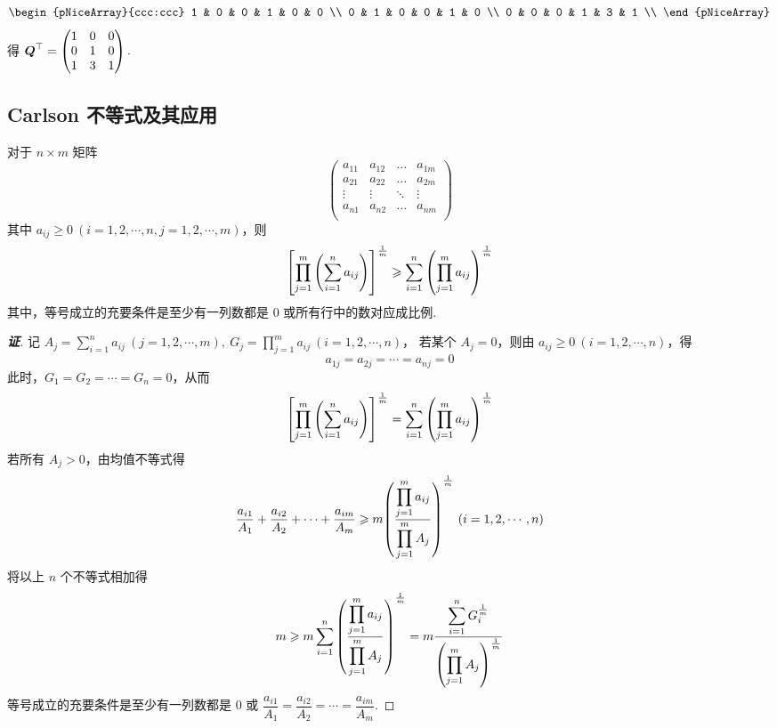 \begin{solution}
$$        \begin{pNiceArray}{ccc:ccc}
            1 & 0 & 0 & 1 & 0 & 0 \\
            0 & 1 & 0 & 0 & 1 & 0 \\
            0 & 0 & 0 & 1 & 3 & 1 \\
        \end{pNiceArray}$$
    得 $\vb*{Q}^{\top}=\begin{pmatrix}
            1 & 0 & 0 \\
            0 & 1 & 0 \\
            1 & 3 & 1
        \end{pmatrix}.$
\end{solution}

\subsection{Carlson 不等式及其应用}

\begin{theorem}
    对于 $n\times m$ 矩阵
    $$\begin{pmatrix}
            a_{11} & a_{12} & \dots  & a_{1m} \\
            a_{21} & a_{22} & \dots  & a_{2m} \\
            \vdots & \vdots & \ddots & \vdots \\
            a_{n1} & a_{n2} & \dots  & a_{nm} \\
        \end{pmatrix}$$
    其中 $a_{ij}\geqslant0~ (i=1,2,\cdots,n,j=1,2,\cdots,m)$，则
    $$\qty[\prod_{j=1}^{m}\qty(\sum_{i=1}^{n}a_{ij})]^{\frac{1}{m}}\geqslant \sum_{i=1}^{n}\qty(\prod_{j=1}^{m}a_{ij})^{\frac{1}{m}}$$
    其中，等号成立的充要条件是至少有一列数都是 0 或所有行中的数对应成比例.
\end{theorem}
\begin{proof}[{\songti \textbf{证}}]
    记 $\displaystyle A_j = \sum_{i=1}^{n}a_{ij}~ (j=1,2,\cdots,m),~G_j=\prod_{j=1}^{m}a_{ij}~ (i=1,2,\cdots,n)$，
    若某个 $A_j=0$，则由 $a_{ij}\geqslant 0~ (i=1,2,\cdots,n)$，得 $$a_{1j}=a_{2j}=\cdots=a_{nj}=0$$
    此时，$G_1=G_2=\cdots=G_n=0$，从而 $$\qty[\prod_{j=1}^{m}\qty(\sum_{i=1}^{n}a_{ij})]^{\frac{1}{m}}=\sum_{i=1}^{n}\qty(\prod_{j=1}^{m}a_{ij})^{\frac{1}{m}}$$
    若所有 $A_j>0$，由均值不等式得 $$\dfrac{a_{i1}}{A_1}+\dfrac{a_{i2}}{A_2}+\cdots+\dfrac{a_{im}}{A_m}\geqslant m\qty(\dfrac{\displaystyle\prod_{j=1}^{m}a_{ij}}{\displaystyle\prod_{j=1}^{m}A_j})^{\frac{1}{m}}~ (i=1,2,\cdots,n)$$
    将以上 $n$ 个不等式相加得
    $$m\geqslant m\sum_{i=1}^{n}\qty(\dfrac{\displaystyle\prod_{j=1}^{m}a_{ij}}{\displaystyle\prod_{j=1}^{m}A_j})^{\frac{1}{m}}=m\dfrac{\displaystyle\sum_{i=1}^{n}G_i^{\frac{1}{m}}}{\qty(\displaystyle\prod_{j=1}^{m}A_j)^{\frac{1}{m}}}$$
    等号成立的充要条件是至少有一列数都是 0 或 $\dfrac{a_{i1}}{A_1}=\dfrac{a_{i2}}{A_2}=\cdots=\dfrac{a_{im}}{A_m}$.
\end{proof}

